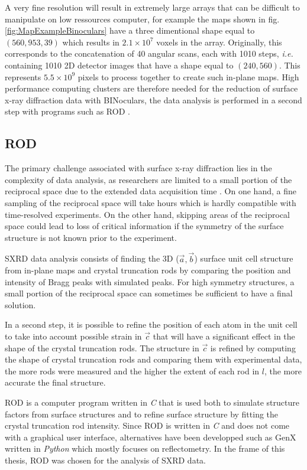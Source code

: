 A very fine resolution will result in extremely large arrays that can be difficult to manipulate on low ressources computer, for example the maps shown in fig. \ref{fig:MapExampleBinoculars} have a three dimentional shape equal to $(560, 953, 39)$ which results in $2.1 \times 10^7$ voxels in the array.
Originally, this corresponds to the concatenation of 40 angular scans, each with 1010 steps, \textit{i.e.} containing 1010 2D detector images that have a shape equal to $(240, 560)$.
This represents $5.5 \times 10^9$ pixels to process together to create such in-plane maps.
High performance computing clusters are therefore needed for the reduction of surface x-ray diffraction data with BINoculars, the data analysis is performed in a second step with programs such as ROD \parencite{Vlieg2000}.

\subsection{ROD} \label{sec:ROD}

The primary challenge associated with surface x-ray diffraction lies in the complexity of data analysis, as researchers are limited to a small portion of the reciprocal space due to the extended data acquisition time \parencite{Gustafson2014}.
On one hand, a fine sampling of the reciprocal space will take hours which is hardly compatible with time-resolved experiments.
On the other hand, skipping areas of the reciprocal space could lead to loss of critical information if the symmetry of the surface structure is not known prior to the experiment.

SXRD data analysis consists of finding the 3D ($\vec{a}, \vec{b}$) surface unit cell structure from in-plane maps and crystal truncation rods by comparing the position and intensity of Bragg peaks with simulated peaks.
For high symmetry structures, a small portion of the reciprocal space can sometimes be sufficient to have a final solution.

In a second step, it is possible to refine the position of each atom in the unit cell to take into account possible strain in $\vec{c}$ that will have a significant effect in the shape of the crystal truncation rods.
The structure in $\vec{c}$ is refined by computing the shape of crystal truncation rods and comparing them with experimental data, the more rods were measured and the higher the extent of each rod in $l$, the more accurate the final structure.

ROD is a computer program written in \textit{C} \parencite{Vlieg2000} that is used both to simulate structure factors from surface structures and to refine surface structure by fitting the crystal truncation rod intensity.
Since ROD is written in \textit{C} and does not come with a graphical user interface, alternatives have been developped such as GenX \parencite{Bjorck2007,Glavic2022} written in \textit{Python} which mostly focuses on reflectometry.
In the frame of this thesis, ROD was chosen for the analysis of SXRD data.

